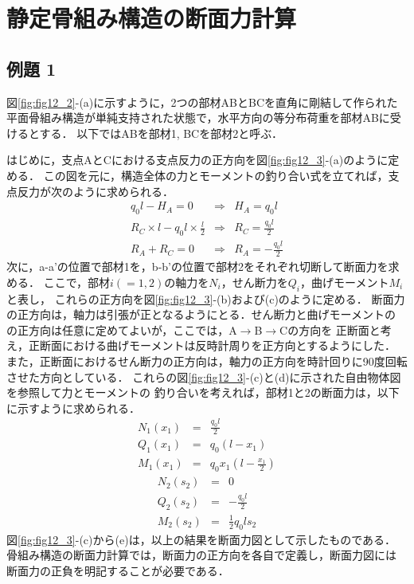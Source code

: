 \documentclass[10pt,a4j]{jarticle}
\begin{document}
\section{静定骨組み構造の断面力計算}
\subsection{例題 1}
図\ref{fig:fig12_2}-(a)に示すように，2つの部材ABとBCを直角に剛結して作られた
平面骨組み構造が単純支持された状態で，水平方向の等分布荷重を部材ABに受けるとする．
以下ではABを部材1, BCを部材2と呼ぶ．

はじめに，支点AとCにおける支点反力の正方向を図\ref{fig:fig12_3}-(a)のように定める．
この図を元に，構造全体の力とモーメントの釣り合い式を立てれば，支点反力が次のように求められる．
\begin{eqnarray}
	q_0l-H_A=0 & \Rightarrow & H_A=q_0l \\ 
	R_C\times l -q_0l \times \frac{l}{2}
	 & \Rightarrow & R_C=\frac{q_0l}{2} \\ 
	R_A+R_C=0 &\Rightarrow& R_A=-\frac{q_0l}{2}
\end{eqnarray}
次に，a-a'の位置で部材1を，b-b'の位置で部材2をそれぞれ切断して断面力を求める．
ここで，部材$i(=1,2)$の軸力を$N_i$，せん断力を$Q_i$，曲げモーメント$M_i$と表し，
これらの正方向を図\ref{fig:fig12_3}-(b)および(c)のように定める．
断面力の正方向は，軸力は引張が正となるようにとる．せん断力と曲げモーメントの
の正方向は任意に定めてよいが，ここでは，A$\rightarrow$B$\rightarrow$Cの方向を
正断面と考え，正断面における曲げモーメントは反時計周りを正方向とするようにした．
また，正断面におけるせん断力の正方向は，軸力の正方向を時計回りに90度回転させた方向としている．
これらの図\ref{fig:fig12_3}-(c)と(d)に示された自由物体図を参照して力とモーメントの
釣り合いを考えれば，部材1と2の断面力は，以下に示すように求められる．
\begin{eqnarray}
	N_1(x_1) &= & \frac{q_0l}{2}  
	\\
	Q_1(x_1) &= & q_0(l-x_1)
	\\
	M_1(x_1) &= & q_0x_1\left(l-\frac{x_1}{2}\right)
\end{eqnarray}
\begin{eqnarray}
	N_2(s_2) &= & 0
	\\
	Q_2(s_2) &= & -\frac{q_0l}{2}
	\\
	M_2(s_2) &= & \frac{1}{2}q_0ls_2
\end{eqnarray}
図\ref{fig:fig12_3}-(c)から(e)は，以上の結果を断面力図として示したものである．
骨組み構造の断面力計算では，断面力の正方向を各自で定義し，断面力図には
断面力の正負を明記することが必要である．
\end{document}
